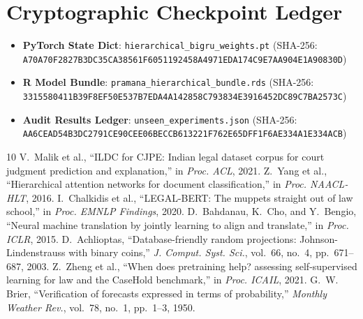 \documentclass[journal,10pt,twocolumn]{IEEEtran}
\begin{document}
\section{Cryptographic Checkpoint Ledger}
\begin{itemize}
    \item \textbf{PyTorch State Dict}: \texttt{hierarchical\_bigru\_weights.pt} (SHA-256: \texttt{A70A70F2827B3DC35CA38561F6051192458A4971EDA174C9E7AA904E1A90830D})
    \item \textbf{R Model Bundle}: \texttt{pramana\_hierarchical\_bundle.rds} (SHA-256: \texttt{3315580411B39F8EF50E537B7EDA4A142858C793834E3916452DC89C7BA2573C})
    \item \textbf{Audit Results Ledger}: \texttt{unseen\_experiments.json} (SHA-256: \texttt{AA6CEAD54B3DC2791CE90CEE06BECCB613221F762E65DFF1F6AE334A1E334ACB})
\end{itemize}

\begin{thebibliography}{10}
V.~Malik et al., ``ILDC for CJPE: Indian legal dataset corpus for court judgment prediction and explanation,'' in \textit{Proc. ACL}, 2021.
Z.~Yang et al., ``Hierarchical attention networks for document classification,'' in \textit{Proc. NAACL-HLT}, 2016.
I.~Chalkidis et al., ``LEGAL-BERT: The muppets straight out of law school,'' in \textit{Proc. EMNLP Findings}, 2020.
D.~Bahdanau, K.~Cho, and Y.~Bengio, ``Neural machine translation by jointly learning to align and translate,'' in \textit{Proc. ICLR}, 2015.
D.~Achlioptas, ``Database-friendly random projections: Johnson-Lindenstrauss with binary coins,'' \textit{J. Comput. Syst. Sci.}, vol.~66, no.~4, pp.~671--687, 2003.
Z.~Zheng et al., ``When does pretraining help? assessing self-supervised learning for law and the CaseHold benchmark,'' in \textit{Proc. ICAIL}, 2021.
G.~W. Brier, ``Verification of forecasts expressed in terms of probability,'' \textit{Monthly Weather Rev.}, vol.~78, no.~1, pp.~1--3, 1950.
\end{thebibliography}
\end{document}
